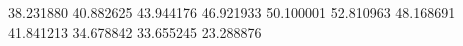 38.231880
40.882625
43.944176
46.921933
50.100001
52.810963
48.168691
41.841213
34.678842
33.655245
23.288876

